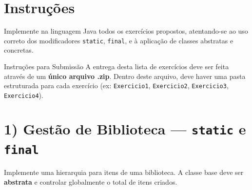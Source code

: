 \documentclass[12pt]{article}
\begin{document}
\section*{Instruções}
Implemente na linguagem Java todos os exercícios propostos, atentando-se ao uso correto dos modificadores \texttt{static}, \texttt{final}, e à aplicação de classes abstratas e concretas.

\begin{block}{Instruções para Submissão}
A entrega desta lista de exercícios deve ser feita através de um \textbf{único arquivo .zip}.
Dentro deste arquivo, deve haver uma pasta estruturada para cada exercício (ex: \texttt{Exercicio1}, \texttt{Exercicio2}, \texttt{Exercicio3}, \texttt{Exercicio4}).
\end{block}

\section*{1) Gestão de Biblioteca — \texttt{static} e \texttt{final}}
Implemente uma hierarquia para itens de uma biblioteca. A classe base deve ser \textbf{abstrata} e controlar globalmente o total de itens criados.

\begin{center} 
\end{center}
\end{document}
